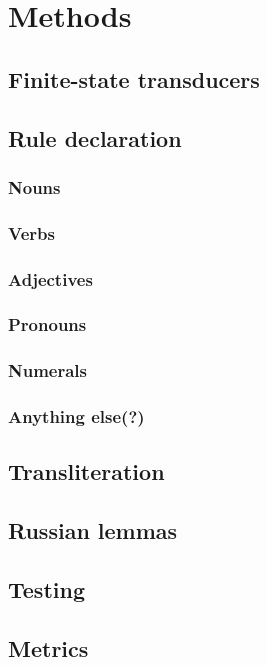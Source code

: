 \section{Methods}

\subsection{Finite-state transducers }

\subsection{Rule declaration }
\subsubsection{Nouns}
\subsubsection{Verbs}
\subsubsection{Adjectives}
\subsubsection{Pronouns}
\subsubsection{Numerals}
\subsubsection{Anything else(?)}

\subsection{Transliteration}
\subsection{Russian lemmas }
\subsection{Testing}
\subsection{Metrics}
